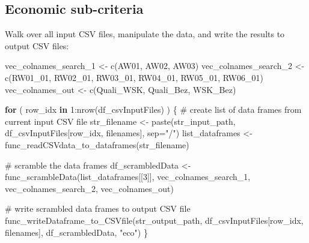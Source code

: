 \documentclass[
]{article}
\newenvironment{Shaded}{\begin{snugshade}}{\end{snugshade}}
\newcommand{\AttributeTok}[1]{\textcolor[rgb]{0.00,0.34,0.68}{#1}}
\newcommand{\CommentTok}[1]{\textcolor[rgb]{0.54,0.53,0.53}{#1}}
\newcommand{\ControlFlowTok}[1]{\textcolor[rgb]{0.12,0.11,0.11}{\textbf{#1}}}
\newcommand{\DecValTok}[1]{\textcolor[rgb]{0.69,0.50,0.00}{#1}}
\newcommand{\FunctionTok}[1]{\textcolor[rgb]{0.39,0.29,0.61}{#1}}
\newcommand{\NormalTok}[1]{\textcolor[rgb]{0.12,0.11,0.11}{#1}}
\newcommand{\OtherTok}[1]{\textcolor[rgb]{0.00,0.43,0.16}{#1}}
\newcommand{\SpecialCharTok}[1]{\textcolor[rgb]{0.24,0.68,0.91}{#1}}
\newcommand{\StringTok}[1]{\textcolor[rgb]{0.75,0.01,0.01}{#1}}
\begin{document}
\hypertarget{economic-sub-criteria}{%
\subsection{Economic sub-criteria}\label{economic-sub-criteria}}

Walk over all input CSV files, manipulate the data, and write the
results to output CSV files:

\begin{Shaded}
\begin{Highlighting}[]
\NormalTok{vec\_colnames\_search\_1 }\OtherTok{\textless{}{-}} \FunctionTok{c}\NormalTok{(}\StringTok{\textquotesingle{}AW01\textquotesingle{}}\NormalTok{, }\StringTok{\textquotesingle{}AW02\textquotesingle{}}\NormalTok{, }\StringTok{\textquotesingle{}AW03\textquotesingle{}}\NormalTok{)}
\NormalTok{vec\_colnames\_search\_2 }\OtherTok{\textless{}{-}} \FunctionTok{c}\NormalTok{(}\StringTok{\textquotesingle{}RW01\_01\textquotesingle{}}\NormalTok{, }\StringTok{\textquotesingle{}RW02\_01\textquotesingle{}}\NormalTok{, }\StringTok{\textquotesingle{}RW03\_01\textquotesingle{}}\NormalTok{, }\StringTok{\textquotesingle{}RW04\_01\textquotesingle{}}\NormalTok{, }\StringTok{\textquotesingle{}RW05\_01\textquotesingle{}}\NormalTok{, }\StringTok{\textquotesingle{}RW06\_01\textquotesingle{}}\NormalTok{)}
\NormalTok{vec\_colnames\_out }\OtherTok{\textless{}{-}} \FunctionTok{c}\NormalTok{(}\StringTok{\textquotesingle{}Quali\_WSK\textquotesingle{}}\NormalTok{, }\StringTok{\textquotesingle{}Quali\_Bez\textquotesingle{}}\NormalTok{, }\StringTok{\textquotesingle{}WSK\_Bez\textquotesingle{}}\NormalTok{)}

\ControlFlowTok{for}\NormalTok{ ( row\_idx }\ControlFlowTok{in} \DecValTok{1}\SpecialCharTok{:}\FunctionTok{nrow}\NormalTok{(df\_csvInputFiles) ) \{}
  \CommentTok{\# create list of data frames from current input CSV file}
\NormalTok{  str\_filename }\OtherTok{\textless{}{-}} \FunctionTok{paste}\NormalTok{(str\_input\_path, df\_csvInputFiles[row\_idx, filenames], }\AttributeTok{sep=}\StringTok{"/"}\NormalTok{)}
\NormalTok{  list\_dataframes }\OtherTok{\textless{}{-}} \FunctionTok{func\_readCSVdata\_to\_dataframes}\NormalTok{(str\_filename)}
  
  \CommentTok{\# scramble the data frames}
\NormalTok{  df\_scrambledData }\OtherTok{\textless{}{-}} \FunctionTok{func\_scrambleData}\NormalTok{(list\_dataframes[[}\DecValTok{3}\NormalTok{]], vec\_colnames\_search\_1, vec\_colnames\_search\_2, vec\_colnames\_out)}
  
  \CommentTok{\# write scrambled data frames to output CSV file}
  \FunctionTok{func\_writeDataframe\_to\_CSVfile}\NormalTok{(str\_output\_path, df\_csvInputFiles[row\_idx, filenames], df\_scrambledData, }\StringTok{"eco"}\NormalTok{)}
\NormalTok{\}}
\end{Highlighting}
\end{Shaded}
\end{document}
